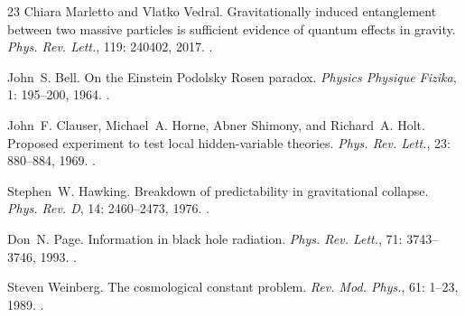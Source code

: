 \documentclass[11pt]{article}
\theoremstyle{definition}
\begin{document}
\begin{thebibliography}{23}
Chiara Marletto and Vlatko Vedral.
\newblock Gravitationally induced entanglement between two massive particles is sufficient evidence of quantum effects in gravity.
\newblock \emph{Phys. Rev. Lett.}, 119: 240402, 2017.
\newblock {}.

John~S. Bell.
\newblock On the {Einstein} {Podolsky} {Rosen} paradox.
\newblock \emph{Physics Physique Fizika}, 1: 195--200, 1964.
\newblock {}.

John~F. Clauser, Michael~A. Horne, Abner Shimony, and Richard~A. Holt.
\newblock Proposed experiment to test local hidden-variable theories.
\newblock \emph{Phys. Rev. Lett.}, 23: 880--884, 1969.
\newblock {}.

Stephen~W. Hawking.
\newblock Breakdown of predictability in gravitational collapse.
\newblock \emph{Phys. Rev. D}, 14: 2460--2473, 1976.
\newblock {}.

Don~N. Page.
\newblock Information in black hole radiation.
\newblock \emph{Phys. Rev. Lett.}, 71: 3743--3746, 1993.
\newblock {}.

Steven Weinberg.
\newblock The cosmological constant problem.
\newblock \emph{Rev. Mod. Phys.}, 61: 1--23, 1989.
\newblock {}.

\end{thebibliography}
 
\end{document}
